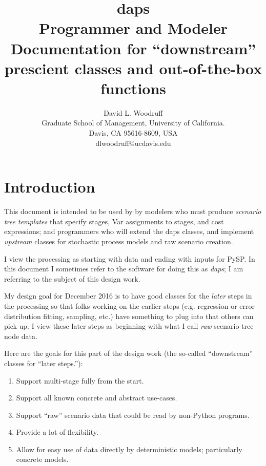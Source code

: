 \documentclass[12pt]{article}
\begin{document}

\title{daps\\Programmer and Modeler\\
  Documentation for ``downstream'' prescient
  classes and out-of-the-box functions}

\author{David L. Woodruff\\ Graduate School of Management, University of California.\\ Davis, CA 95616-8609, USA\\ dlwoodruff@ucdavis.edu}
\maketitle
\section{Introduction}

This document is intended to be used by by modelers who must produce
{\em scenario tree templates} that specify stages, Var assignments to
stages, and cost expressions; and programmers who will
extend the daps classes, and implement {\em upstream} classes for
stochastic process models and raw scenario creation.

I view the processing as starting with data and ending with inputs for
PySP. In this document I sometimes refer to the software for doing
this as {\em daps}; I am referring to the subject of this design work.

My design goal for December 2016 is to have good classes for the {\em
later} steps in the processing so that folks working on the earlier
steps (e.g. regression or error distribution fitting, sampling, etc.)
have something to plug into that others can pick up. I view these
later steps as beginning with what I call {\em raw} scenario tree node
data.

Here are the goals for this part of the design work (the so-called ``downstream''
classes for ``later steps.''):
\begin{enumerate}
\item Support multi-stage fully from the start.
\item Support all known concrete and abstract use-cases.
\item Support ``raw'' scenario data that could be read by non-Python programs.
\item Provide a lot of flexibility.
\item Allow for easy use of data directly by deterministic models; particularly concrete models.
\end{enumerate}
\end{document}
